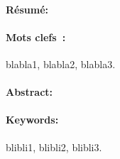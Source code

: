 \newpage
\pagestyle{empty}

\paragraph{R\'esum\'e:}

\begin{small}
\lipsum[20]

\lipsum[21]
\end{small}
\vspace*{-5mm}
\paragraph{Mots clefs~:} {\small blabla1, blabla2, blabla3.}

\paragraph{Abstract:}

\begin{small}

\lipsum[22]

\lipsum[23]

\end{small}
\vspace*{-5mm}
\paragraph{Keywords:} {\small blibli1, blibli2, blibli3.}
